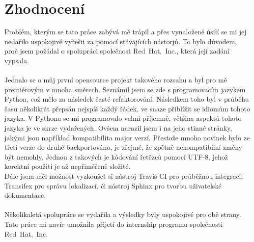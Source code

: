 \documentclass[
  field=inf,
  biblatex,
  glossaries,
  index
]{kidiplom}
\begin{document}
\section{Zhodnocení}
Problém, kterým se tato práce zabývá mě trápil a přes vynaložené úsilí se mi jej nedařilo uspokojivě vyřešit za pomocí stávajících nástorjů. To bylo důvodem, proč jsem požádal o spolupráci společnost Red~Hat,~Inc., která její zadání vypsala.
\\
\\
Jednalo se o můj první opensource projekt takového rozsahu a byl pro mě premiérovým v mnoha směrech. Seznámil jsem se zde s programovacím jazykem Python, což mělo za následek časté refaktorování. Následkem toho byl v průběhu času několikrát přepsán nejspíš každý řádek, ve snaze přiblížit se idiomům tohoto jazyka. V Pythonu se mi programovalo velmi příjemně, většina aspektů tohoto jazyka je ve skrze vydařených. Ovšem narazil jsem i na jeho stinné stránky, jakými jsou například kompatibilita major verzí. Přestože mnoho novinek bylo ze třetí verze do druhé backportováno, je zřejmé, že zpětně nekompatibilní změny být nemohly. Jednou z takových je kódování řetězců pomocí UTF-8, jehož korektní použití je až nepřiměřeně složité.
\\
Dále jsem měl možnost vyzkoušet si nástroj Travis CI pro průběžnou integraci, Transifex pro správu lokalizací, či nástroj Sphinx pro tvorbu uživatelské dokumentace.
\\
\\
Několikaletá spolupráce se vydařila a výsledky byly uspokojivé pro obě strany. Tato práce mi navíc umožnila přijetí do internship programu společnosti Red~Hat,~Inc.
\end{document}
